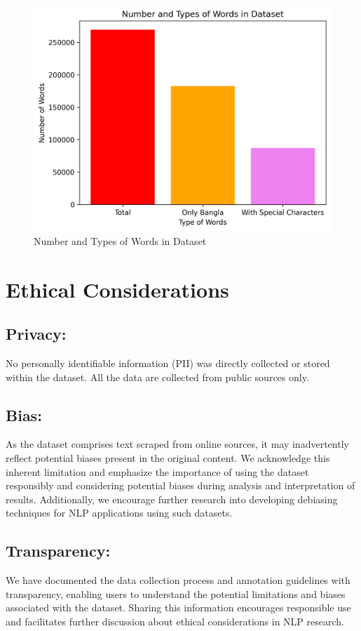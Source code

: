  \begin{figure}[htbp]
    \centering
    \includegraphics[width=\textwidth]{Images/Graph/output1.png}
    \caption{Number and Types of Words in Dataset}
    \label{fig:types}
\end{figure} 

\newpage
\section{Ethical Considerations}

\subsection{Privacy:} No personally identifiable information (PII) was directly collected or stored within the dataset. All the data are collected from public sources only.

\subsection{Bias:} As the dataset comprises text scraped from online sources, it may inadvertently reflect potential biases present in the original content. We acknowledge this inherent limitation and emphasize the importance of using the dataset responsibly and considering potential biases during analysis and interpretation of results. Additionally, we encourage further research into developing debiasing techniques for NLP applications using such datasets.

\subsection{Transparency:} We have documented the data collection process and annotation guidelines with transparency, enabling users to understand the potential limitations and biases associated with the dataset. Sharing this information encourages responsible use and facilitates further discussion about ethical considerations in NLP research.

